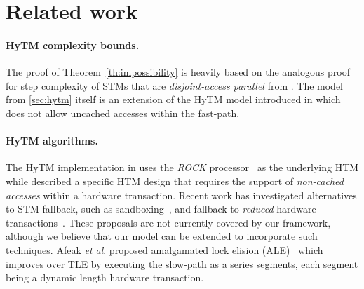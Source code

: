\section{Related work}
\label{sec:rel}
%
\paragraph{HyTM complexity bounds.}
The proof of Theorem~\ref{th:impossibility} is heavily based on the analogous proof for step complexity of
STMs that are \emph{disjoint-access parallel} from \cite{prog15-pact}.
The model from \cref{sec:hytm} itself is an extension of the HyTM model introduced in \cite{hytm14disc}
which does not allow uncached accesses within the fast-path.

\paragraph{HyTM algorithms.}
The HyTM implementation in \cite{damronhytm} uses the \emph{ROCK} processor~\cite{rock} as the underlying HTM
while \cite{kumarhytm} described a specific HTM design that requires the support of \emph{non-cached accesses}
within a hardware transaction. 
Recent work has investigated alternatives to STM fallback, such as sandboxing~\cite{ALM14,CTGM14}, and fallback to \emph{reduced} hardware transactions~\cite{MS13}. These proposals are not currently covered by our framework, although we believe that our model can be extended to incorporate such techniques.
Afeak \emph{et al}. proposed amalgamated lock elision (ALE)~\cite{ale15} which improves over TLE
by executing the slow-path as a series segments, each segment being a dynamic length hardware transaction.
